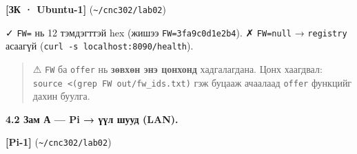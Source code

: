 \textbf{{[}ЗК · Ubuntu-1{]}} (\texttt{\textasciitilde{}/cnc302/lab02})

\begin{Shaded}
\begin{Highlighting}[]
\OperatorTok{\textgreater{}}
 \KeywordTok{\textbackslash{}}
       \KeywordTok{|} \VariableTok{)}
  \KeywordTok{|} 
 \KeywordTok{\{}  \KeywordTok{\textbackslash{}}
   \StringTok{:}\StringTok{,}\StringTok{:[}\StringTok{]\}"} \KeywordTok{|} \KeywordTok{;} \KeywordTok{\}}
\end{Highlighting}
\end{Shaded}

✓ \texttt{FW=} нь 12 тэмдэгттэй hex (жишээ \texttt{FW=3fa9c0d1e2b4}). ✗ \texttt{FW=null} → \texttt{registry} асаагүй (\texttt{curl\ -s\ localhost:\allowbreak{}8090/\allowbreak{}health}).

\begin{quote}
⚠ \texttt{FW} ба \texttt{offer} нь \textbf{зөвхөн энэ цонхонд} хадгалагдана. Цонх хаагдвал: \texttt{source\ \textless{}(grep\ FW\ out/\allowbreak{}fw\_\allowbreak{}ids.\allowbreak{}txt)} гэж буцааж ачаалаад \texttt{offer} функцийг дахин буулга.
\end{quote}

\textbf{4.2 Зам А --- Pi → үүл шууд (LAN).}

\textbf{{[}Pi-1{]}} (\texttt{\textasciitilde{}/cnc302/lab02})

\begin{Shaded}
\begin{Highlighting}[]
 \KeywordTok{|} 
\end{Highlighting}
\end{Shaded}

